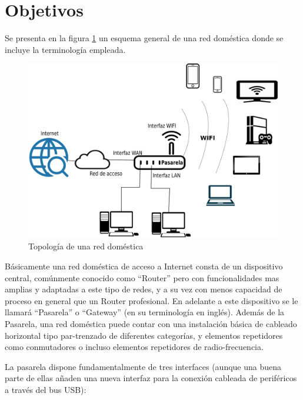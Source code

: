 \documentclass[12pt]{article}
\begin{document}
\section{Objetivos}
    Se presenta en la figura \ref{fig:red_soho} un esquema general de una red doméstica donde se incluye la terminología empleada.

    \begin{figure}[hp]
    \centering
        \includegraphics[scale=0.2]{soho_network.eps}
        \caption{Topología de una red doméstica}
        \label{fig:red_soho}
    \end{figure}

    Básicamente una red doméstica de acceso a Internet consta de un dispositivo central, comúnmente conocido como ``Router'' pero con funcionalidades mas amplias y adaptadas a este tipo de redes, y a su vez con menos capacidad de proceso en general que un Router profesional. En adelante a este dispositivo se le llamará ``Pasarela'' o ``Gateway'' (en su terminología en inglés). Además de la Pasarela, una red doméstica puede contar con una instalación básica de cableado horizontal tipo par-trenzado de diferentes categorías, y elementos repetidores como conmutadores o incluso elementos repetidores de radio-frecuencia.

    La pasarela dispone fundamentalmente de tres interfaces (aunque una buena parte de ellas añaden una nueva interfaz para la conexión cableada de periféricos a través del bus USB): 
\end{document}
